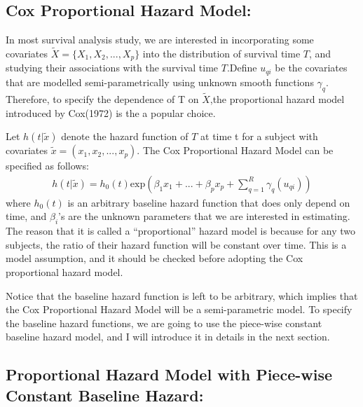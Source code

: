 \documentclass[]{article}
\begin{document}
\newpage

\hypertarget{cox-proportional-hazard-model}{%
\subsection{Cox Proportional Hazard
Model:}\label{cox-proportional-hazard-model}}

In most survival analysis study, we are interested in incorporating some
covariates \(\tilde{X} =\{X_1,X_2,...,X_p\}\) into the distribution of
survival time \(T\), and studying their associations with the survival
time \(T\).Define \(u_{qi}\) be the covariates that are modelled
semi-parametrically using unknown smooth functions \(\gamma_q\).
Therefore, to specify the dependence of T on \(\tilde{X}\),the
proportional hazard model introduced by Cox(1972) is the a popular
choice.

Let \(h(t|\tilde{x})\) denote the hazard function of \(T\) at time t for
a subject with covariates \(\tilde{x} = (x_1,x_2,...,x_p)\). The Cox
Proportional Hazard Model can be specified as follows:
\begin{equation}\begin{aligned}\label{eqn:CoxHazardModel}
h(t|\tilde{x}) = h_0(t)\text{exp}(\beta_1x_1+...+\beta_px_p+\sum_{q=1}^{R} \gamma_q(u_{qi}))
\end{aligned}\end{equation} where \(h_0(t)\) is an arbitrary baseline
hazard function that does only depend on time, and \(\beta_i\)'s are the
unknown parameters that we are interested in estimating. The reason that
it is called a ``proportional'' hazard model is because for any two
subjects, the ratio of their hazard function will be constant over time.
This is a model assumption, and it should be checked before adopting the
Cox proportional hazard model.

Notice that the baseline hazard function is left to be arbitrary, which
implies that the Cox Proportional Hazard Model will be a semi-parametric
model. To specify the baseline hazard functions, we are going to use the
piece-wise constant baseline hazard model, and I will introduce it in
details in the next section.

\hypertarget{proportional-hazard-model-with-piece-wise-constant-baseline-hazard}{%
\subsection{Proportional Hazard Model with Piece-wise Constant Baseline
Hazard:}\label{proportional-hazard-model-with-piece-wise-constant-baseline-hazard}}
\end{document}

